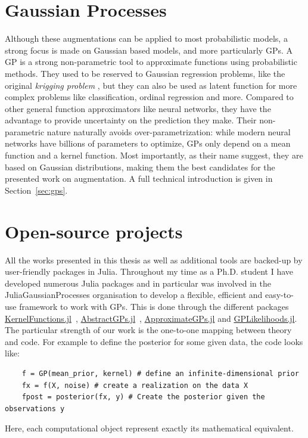 \section{Gaussian Processes}

Although these augmentations can be applied to most probabilistic models, a strong focus is made on Gaussian based models, and more particularly \acf{GPs}.
A \ac{GP} is a strong non-parametric tool to approximate functions using probabilistic methods.
They used to be reserved to Gaussian regression problems, like the original \textit{krigging problem} \needcite, but they can also be used as latent function for more complex problems like classification, ordinal regression and more.
Compared to other general function approximators like neural networks, they have the advantage to provide uncertainty on the prediction they make.
Their non-parametric nature naturally avoids over-parametrization: while modern neural networks have billions of parameters to optimize, \ac{GPs} only depend on a mean function and a kernel function.
Most importantly, as their name suggest, they are based on Gaussian distributions, making them the best candidates for the presented work on augmentation.
A full technical introduction is given in Section~\ref{sec:gps}.

\section{Open-source projects}

All the works presented in this thesis as well as additional tools are backed-up by user-friendly packages in Julia.
Throughout my time as a Ph.D. student I have developed numerous Julia packages and in particular was involved in the JuliaGaussianProcesses organisation to develop a flexible, efficient and easy-to-use framework to work with \ac{GPs}.
This is done through the different packages \href{https://github.com/JuliaGaussianProcesses/KernelFunctions.jl}{KernelFunctions.jl}~\cite{theo_galy_fajou_2022_6246597}, \href{https://github.com/JuliaGaussianProcesses/AbstractGPs.jl}{AbstractGPs.jl}~\cite{david_widmann_2022_5939997}, \href{https://github.com/JuliaGaussianProcesses/ApproximateGPs.jl}{ApproximateGPs.jl} and \href{https://github.com/JuliaGaussianProcesses/GPLikelihoods.jl}{GPLikelihoods.jl}.
The particular strength of our work is the one-to-one mapping between theory and code.
For example to define the posterior for some given data, the code looks like:
\begin{verbatim}
    f = GP(mean_prior, kernel) # define an infinite-dimensional prior
    fx = f(X, noise) # create a realization on the data X
    fpost = posterior(fx, y) # Create the posterior given the observations y
\end{verbatim}
Here, each computational object represent exactly its mathematical equivalent.

